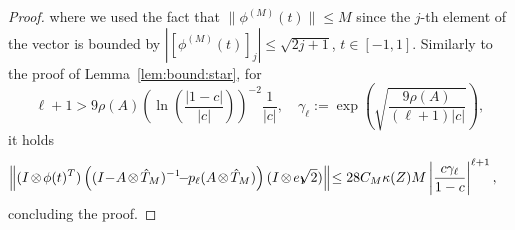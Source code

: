 \documentclass[final,1p,times,number]{elsarticle}
\theoremstyle{plain}%
\begin{document}
\begin{proof}
where we used the fact that \( \| \phi^{(M)}(t) \| \leq M\) since the $j$-th element of the vector is bounded by \(|[\phi^{(M)}(t)]_j| \leq \sqrt{2j+1}\), \(t \in [-1,1]\).
Similarly to the proof of Lemma~\ref{lem:bound:star}, for
\[\ell+1 > 9\rho(A) \left(\ln\left(\frac{|1-c|}{|c|}\right)\right)^{-2}\frac{1}{|c|}, \quad\gamma_\ell :=\exp\left(\sqrt{\frac{9\rho(A)}{(\ell+1)|c|}}\right), \] 
 it holds
\begin{align*}
\left\|(I\hspace{-1pt}\otimes \hspace{-1pt}\phi(t)^T)\left( (I\hspace{-2pt}-\hspace{-2pt}A\hspace{-1pt}\otimes\hspace{-1pt}\hat{T}_{M})^{-1}\hspace{-4pt}-\hspace{-3pt}p_\ell(A\hspace{-1pt}\otimes\hspace{-1pt}\hat{T}_{M}) \right) (I\hspace{-1pt}\otimes\hspace{-1pt} e_1\hspace{-5pt} \sqrt{2})\right\|\hspace{-2pt} 
&\leq 28 C_{M} \kappa(Z) M \left| \frac{c\gamma_\ell}{1-c} \right| ^{\ell + 1}, 
\end{align*}
concluding the proof.
\end{proof}
\end{document}
